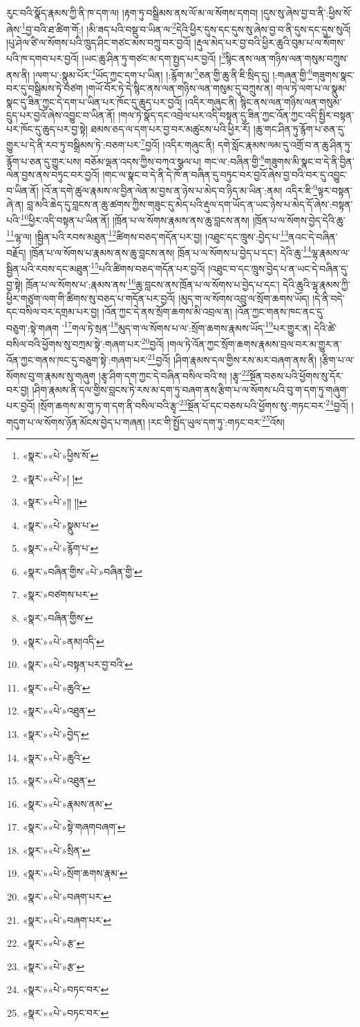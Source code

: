 རུང་བའི་སྣོད་རྣམས་ཀྱི་ནི་ཁ་དག་ལ། །རྟག་ཏུ་བསྒྲིམས་ནས་ལོ་མ་ལ་སོགས་དགབ། །དུས་སུ་ཞེས་བྱ་བ་ནི་:ཕྱིས་སོ་ཞེས་\footnote{«སྣར་»«པེ་»ཕྱིས་སོ་}བྱ་བའི་ཐ་ཚིག་གོ:། །མི་ཟད་པའི་བསྡུ་བ་ཡིན་ལ་\footnote{«སྣར་»«པེ་»། །}དེའི་ཕྱིར་དུས་དང་དུས་སུ་ཞེས་བྱ་བ་ནི་དུས་དང་དུས་སུའོ། །པུ་ཤེལ་ཙི་ལ་སོགས་པའི་ཁྲུད་ཤིང་གཙང་མས་བཀྲུ་བར་བྱའོ། །རྡུལ་མེད་པར་བྱ་བའི་ཕྱིར་ཆུའི་བུམ་པ་ལ་སོགས་པའི་ཁ་དགབ་པར་བྱའོ། །ཡང་ཆུ་ཤིན་ཏུ་གཙང་མ་དག་སྤྱད་པར་བྱའོ། །\footnote{«སྣར་»«པེ་»།། །།}སྙིང་ནས་ལན་གཉིས་ལན་གསུམ་བཀྲུས་ནས་ནི། །ལག་པ་:སྣུམ་པོར་\footnote{«སྣར་»«པེ་»སྣུམ་པ་}ཡོད་ཀྱང་དག་པ་ཡིན། །:རྙོག་མ་\footnote{«སྣར་»«པེ་»རྙོག་པ་}ཅན་གྱི་ཆུ་ནི་ཇི་སྲིད་དུ། །:གཞན་གྱི་\footnote{«སྣར་»བཞིན་གྱིས་«པེ་»བཞིན་གྱི་}གཟུགས་སྣང་བར་དུ་བསྒྲིམས་ཏེ་བཙག །གཡོ་བོར་ཏེ་དེ་སྙིང་ནས་ལན་གཉིས་ལན་གསུམ་དུ་བཀྲུས་ན། གལ་ཏེ་ལག་པ་ལ་སྣུམ་སྣང་དུ་ཟིན་ཀྱང་དེ་དག་པ་ཡིན་པར་ཁོང་དུ་ཆུད་པར་བྱའོ། །འདིར་གཞུང་ནི། སྙིང་ནས་ལན་གཉིས་ལན་གསུམ་དྲུད་པར་བྱའོ་ཞེས་འབྱུང་བ་ཡིན་ནོ། །གལ་ཏེ་སྣོད་དང་འབྲེལ་པར་འདི་བསྟན་དུ་ཟིན་ཀྱང་འོན་ཀྱང་འདི་སྤྱིར་བསྟན་པར་ཁོང་དུ་ཆུད་པར་བྱ་སྟེ། ཐམས་ཅད་ལ་དག་པར་བྱ་བར་མཚུངས་པའི་ཕྱིར་རོ། །ཆུ་གང་ཤིན་ཏུ་རྙོག་པ་ཅན་དུ་གྱུར་པ་དེ་ནི་རབ་ཏུ་བསྒྲིམས་ཏེ་:བཅག་པར་\footnote{«སྣར་»བཙགས་པར་}བྱའོ། །འདིར་གཞུང་ནི། དགེ་སློང་རྣམས་ལམ་དུ་འགྲོ་བ་ན་ཆུ་ཤིན་ཏུ་རྙོག་པ་ཅན་དུ་གྱུར་པས། བཅོམ་ལྡན་འདས་ཀྱིས་བཀའ་སྩལ་པ། གང་ལ་:བཞིན་གྱི་\footnote{«སྣར་»བཞིན་གྱིས་}གཟུགས་མི་སྣང་བ་དེ་ནི་བྱིན་ལེན་བྱས་ནས་བཏུང་བར་བྱའོ། །གང་ལ་སྣང་བ་དེ་ནི་དེ་ཁོ་ན་བཞིན་དུ་བཏུང་བར་བྱའོ་ཞེས་བྱ་བའི་བར་དུ་འབྱུང་བ་ཡིན་ནོ། །འོ་ན་དགེ་ཚུལ་རྣམས་ལ་བྱིན་ལེན་མ་བྱས་ན་ཉེས་པ་མེད་བ་ཉིད་མ་ཡིན་:ནམ། འདིར་ཇི་\footnote{«སྣར་»«པེ་»ནམ།འདི་}ལྟར་བསྟན་ཞེ་ན། བླ་མའི་ཆེད་དུ་བླངས་ན་ཆུ་ཚགས་ཀྱིས་གཟུང་དུ་མེད་པའི་རྡུལ་དག་ཡོད་ན་ཡང་ཉེས་པ་མེད་དོ་ཞེས་:བསྟན་པའི་\footnote{«སྣར་»«པེ་»བསྟན་པར་བྱ་བའི་}ཕྱིར་འདི་བསྟན་པ་ཡིན་ནོ། །ཁྲོན་པ་ལ་སོགས་རྣམས་ནས་ཆུ་བླངས་ནས། །ཁྲོན་པ་ལ་སོགས་བྱེད་དེའི་ཆུ་\footnote{«སྣར་»«པེ་»ཆུའི་}ལྷ་ལ། །སྦྱིན་པའི་རབས་མཐུན་\footnote{«སྣར་»«པེ་»འཐུན་}ཚིགས་བཅད་གདོན་པར་བྱ། །འཐུང་དང་ཁྲུས་:བྱེད་པ་\footnote{«སྣར་»«པེ་»བྱེད་}ནའང་དེ་བཞིན་བརྗོད། །ཁྲོན་པ་ལ་སོགས་པ་རྣམས་ནས་ཆུ་བླངས་ནས། ཁྲོན་པ་ལ་སོགས་པ་བྱེད་པ་དང་། དེའི་ཆུ་\footnote{«སྣར་»«པེ་»ཆུའི་}ལྷ་རྣམས་ལ་སྦྱིན་པའི་རབས་དང་མཐུན་\footnote{«སྣར་»«པེ་»འཐུན་}པའི་ཚིགས་བཅད་གདོན་པར་བྱའོ། །འཐུང་བ་དང་ཁྲུས་བྱེད་པ་ན་ཡང་དེ་བཞིན་དུ་བྱ་སྟེ། ཁྲོན་པ་ལ་སོགས་པ་:རྣམས་ནས་\footnote{«སྣར་»«པེ་»རྣམས་ནམ་}ཆུ་བླངས་ནས་ཁྲོན་པ་ལ་སོགས་པ་བྱེད་པ་དང་། དེའི་ཆུའི་ལྷ་རྣམས་ཀྱི་ཕྱིར་གཙུག་ལག་གི་ཚིགས་སུ་བཅད་པ་གདོན་པར་བྱའོ། །མུད་ག་ལ་སོགས་འབྲུ་ལ་སྲོག་ཆགས་ཡོད། །དེ་ནི་བདེ་དང་བསིལ་བར་དགྲམ་པར་བྱ། །འོན་ཀྱང་དེ་ནས་སྲོག་ཆགས་མི་འབྲལ་ན། །འོན་ཀྱང་གནས་ཁང་ནང་དུ་བཅུག་:སྟེ་གཞག ་\footnote{«སྣར་»«པེ་»སྟེ་གཞགབཞག་}གལ་ཏེ་སྲན་\footnote{«སྣར་»«པེ་»སྲིན་}མུད་ག་ལ་སོགས་པ་ལ་:སྲོག་ཆགས་རྣམས་ཡོད་\footnote{«སྣར་»«པེ་»སྲོག་ཆགས་རྣམ་}པར་གྱུར་ན། དེའི་ཚེ་བསིལ་བའི་ཕྱོགས་སུ་བཀྲམ་སྟེ་:གཞག་པར་\footnote{«སྣར་»«པེ་»བཞག་པར་}བྱའོ། །གལ་ཏེ་འོན་ཀྱང་སྲོག་ཆགས་རྣམས་བྲལ་བར་མ་གྱུར་ན་འོན་ཀྱང་གནས་ཁང་དུ་བཅུག་སྟེ་:གཞག་པར་\footnote{«སྣར་»«པེ་»བཞག་པར་}བྱའོ། །ཤིག་རྣམས་དལ་གྱིས་རས་མར་བཞག་ནས་ནི། །རྩིག་པ་ལ་སོགས་བུ་ག་རྣམས་སུ་གཞུག །རྩྭ་ཤིག་དག་ཀྱང་དེ་བཞིན་བསིལ་བའི་ས། །རྩྭ་\footnote{«སྣར་»«པེ་»རྩ་}སྔོན་བཅས་པའི་ཕྱོགས་སུ་དོར་བར་བྱ། །ཤིག་རྣམས་ནི་དལ་གྱིས་བླངས་ཏེ་རས་མ་དག་ཏུ་བཞག་ནས་རྩིག་པ་ལ་སོགས་པའི་བུ་ག་དག་ཏུ་གཞུག་པར་བྱའོ། །སྲོག་ཆགས་མ་གུ་ཏ་ག་དག་ནི་བསིལ་བའི་རྩྭ་\footnote{«སྣར་»«པེ་»རྩ་}སྔོན་པོ་དང་བཅས་པའི་ཕྱོགས་སུ་:གཏང་བར་\footnote{«སྣར་»«པེ་»བཏང་བར་}བྱའོ། །གདུག་པ་ལ་སོགས་ཉོན་མོངས་བྱེད་པ་གཞན། །རང་གི་སྤྱོད་ཡུལ་དག་ཏུ་:གཏང་བར་\footnote{«སྣར་»«པེ་»བཏང་བར་}འོས། 